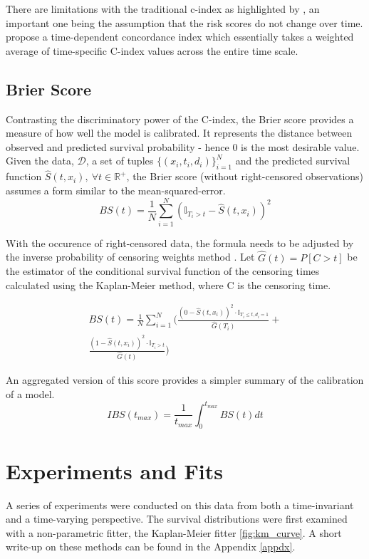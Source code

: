 \documentclass[%
 reprint,
 amsmath,amssymb,
 aps,nofootinbib
]{revtex4-2}
\begin{document}
There are limitations with the traditional c-index as highlighted by \cite{Hartman_Kim_He_Kalbfleisch_2023}, an important one being the assumption that the risk scores do not change over time. \cite{Heagerty_Zheng_2005} propose a time-dependent concordance index which essentially takes a weighted average of time-specific C-index values across the entire time scale.

\subsection{\label{ibs}Brier Score}

Contrasting the discriminatory power of the C-index, the Brier score provides a measure of how well the model is calibrated. It represents the distance between observed and predicted survival probability - hence 0 is the most desirable value. Given the data, $\mathcal{D}$, a set of tuples $\{(x_i , t_i , d_i)\}_{i=1}^{N}$ and the predicted survival function $\hat{S}(t, x_i),\ \forall t \in \mathbb{R^{+}}$, the Brier score (without right-censored observations) assumes a form similar to the mean-squared-error.
\[
BS(t) = \frac{1}{N}\sum^{N}_{i=1}(\mathbb{I}_{T_i>t}-\hat{S}(t, x_i))^2
\]

With the occurence of right-censored data, the formula needs to be adjusted by the inverse probability of censoring weights method \cite{graf_bs}. Let $\hat{G}(t) = P[C>t]$ be the estimator of the conditional survival function of the censoring times calculated using the Kaplan-Meier method, where C is the censoring time.

\begin{align*}
BS(t) = \frac{1}{N}\sum^{N}_{i=1}\Bigg(\frac{(0-\hat{S}(t,x_i))^2 \cdot \mathbb{I}_{T_i\le t, d_i = 1}}{\hat{G}(T_i)} +\\
\frac{(1-\hat{S}(t,x_i))^2 \cdot \mathbb{I}_{T_i > t}}{\hat{G}(t)} \Bigg)
\end{align*}

An aggregated version of this score provides a simpler summary of the calibration of a model.
\[
IBS(t_{max})= \frac{1}{t_{max}} \int^{t_{max}}_{0} BS(t) dt
\]

\section{\label{exp}Experiments and Fits}
A series of experiments were conducted on this data from both a time-invariant and a time-varying perspective. The  survival distributions were first examined with a non-parametric fitter, the Kaplan-Meier fitter \ref{fig:km_curve}. A short write-up on these methods can be found in the Appendix \ref{appdx}. \\
\end{document}
